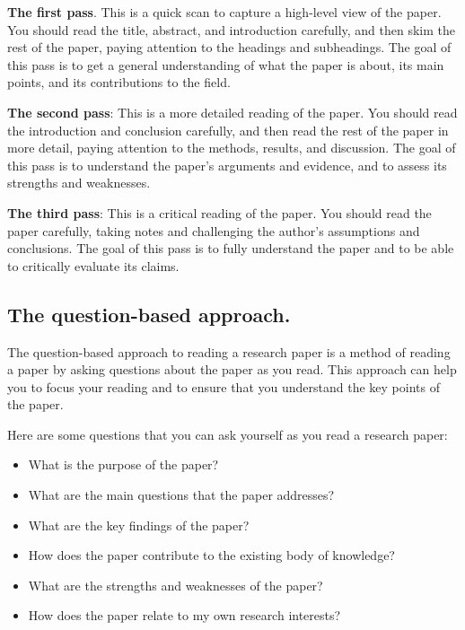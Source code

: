 \documentclass[
]{book}
\begin{document}
\textbf{The first pass}. This is a quick scan to capture a high-level view of the paper. You should read the title, abstract, and introduction carefully, and then skim the rest of the paper, paying attention to the headings and subheadings. The goal of this pass is to get a general understanding of what the paper is about, its main points, and its contributions to the field.

\textbf{The second pass}: This is a more detailed reading of the paper. You should read the introduction and conclusion carefully, and then read the rest of the paper in more detail, paying attention to the methods, results, and discussion. The goal of this pass is to understand the paper's arguments and evidence, and to assess its strengths and weaknesses.

\textbf{The third pass}: This is a critical reading of the paper. You should read the paper carefully, taking notes and challenging the author's assumptions and conclusions. The goal of this pass is to fully understand the paper and to be able to critically evaluate its claims.

\subsection*{The question-based approach.}\label{the-question-based-approach.}

The question-based approach to reading a research paper is a method of reading a paper by asking questions about the paper as you read. This approach can help you to focus your reading and to ensure that you understand the key points of the paper.

Here are some questions that you can ask yourself as you read a research paper:

\begin{itemize}
\item
  What is the purpose of the paper?
\item
  What are the main questions that the paper addresses?
\item
  What are the key findings of the paper?
\item
  How does the paper contribute to the existing body of knowledge?
\item
  What are the strengths and weaknesses of the paper?
\item
  How does the paper relate to my own research interests?
\end{itemize}
\end{document}
